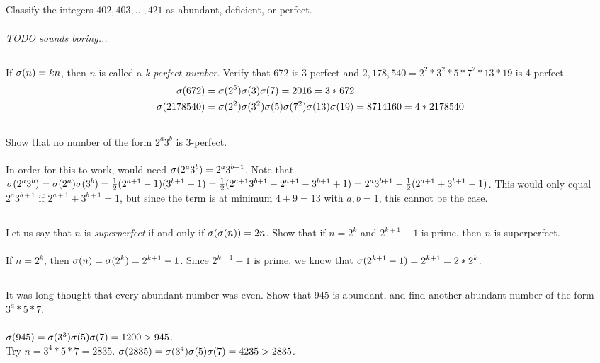 \documentclass{article}
\begin{document}
\subsection{}
Classify the integers $402, 403, ..., 421$ as abundant, deficient, or perfect.\\~\\
\textit{TODO sounds boring...}

\subsection{}
If $\sigma(n) = kn$, then $n$ is called a \textit{k-perfect number}.
Verify that 672 is 3-perfect and $2,178,540 = 2^2 * 3^2 * 5 * 7^2 * 13 * 19$
is 4-perfect.
\begin{align*}
    \sigma(672) &= \sigma(2^5)\sigma(3)\sigma(7) = 2016 = 3 * 672\\
    \sigma(2178540) &= \sigma(2^2)\sigma(3^2)\sigma(5)\sigma(7^2)\sigma(13)\sigma(19) = 8714160 = 4 * 2178540
\end{align*}

\subsection{}
Show that no number of the form $2^a3^b$ is 3-perfect.\\~\\
In order for this to work, would need $\sigma(2^a3^b) = 2^a3^{b+1}$.
Note that $\sigma(2^a3^b) = \sigma(2^a)\sigma(3^b)
= \frac{1}{2}(2^{a + 1} - 1)(3^{b + 1} - 1)
= \frac{1}{2}(2^{a + 1}3^{b + 1} - 2^{a + 1} - 3^{b + 1} + 1)
= 2^{a}3^{b + 1} - \frac{1}{2}(2^{a + 1} + 3^{b + 1} - 1)$.
This would only equal $2^a3^{b+1}$ if $2^{a + 1} + 3^{b + 1} = 1$,
but since the term is at minimum $4 + 9 = 13$ with $a, b = 1$,
this cannot be the case.

\subsection{}
Let us say that $n$ is \textit{superperfect} if and only if $\sigma(\sigma(n)) = 2n$.
Show that if $n = 2^k$ and $2^{k + 1} - 1$ is prime, then $n$ is superperfect.\\~\\
If $n = 2^k$, then $\sigma(n) = \sigma(2^k) = 2^{k + 1} - 1$.
Since $ 2^{k + 1} - 1$ is prime, we know that $\sigma(2^{k + 1} - 1) = 2^{k + 1} = 2*2^k$.

\subsection{}
It was long thought that every abundant number was even.
Show that 945 is abundant, and find another abundant number of the form $3^a*5*7$.\\~\\
$\sigma(945) = \sigma(3^3)\sigma(5)\sigma(7) = 1200 > 945$.\\
Try $n = 3^4 * 5 * 7 = 2835$. $\sigma(2835) = \sigma(3^4)\sigma(5)\sigma(7) = 4235 > 2835$.
\end{document}
